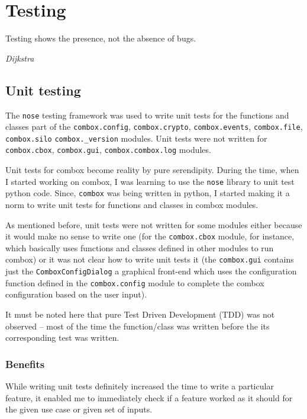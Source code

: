 \chapter{Testing}\label{ch:5}

\epigraph{Testing shows the presence, not the absence of
  bugs.}{\textit{Dijkstra}\cite{dijkstra69}}

\section{Unit testing}\label{sec:5-unit-testing}

The \verb+nose+\cite{pylib:nose} testing framework was used to
write unit tests for the functions and classes part of the
\verb+combox.config+, \verb+combox.crypto+, \verb+combox.events+,
\verb+combox.file+, \verb+combox.silo+ \verb+combox._version+
modules. Unit tests were not written for \verb+combox.cbox+,
\verb+combox.gui+, \verb+combox.combox.log+ modules.

Unit tests for combox become reality by pure serendipity. During the
time, when I started working on combox, I was learning to use the
\verb+nose+ library to unit test python code. Since, \verb+combox+ was
being written in python, I started making it a norm to write unit
tests for functions and classes in combox modules.

As mentioned before, unit tests were not written for some modules
either because it would make no sense to write one (for the
\verb+combox.cbox+ module, for instance, which basically uses
functions and classes defined in other modules to run combox) or it
was not clear how to write unit tests it (the \verb+combox.gui+
contains just the \verb+ComboxConfigDialog+ a graphical front-end
which uses the configuration function defined in the
\verb+combox.config+ module to complete the combox configuration based
on the user input).

It must be noted here that pure Test Driven Development (TDD) was not
observed -- most of the time the function/class was written before the
its corresponding test was written.

\subsection{Benefits}

While writing unit tests definitely increased the time to write a
particular feature, it enabled me to immediately check if a feature
worked as it should for the given use case or given set of inputs.

